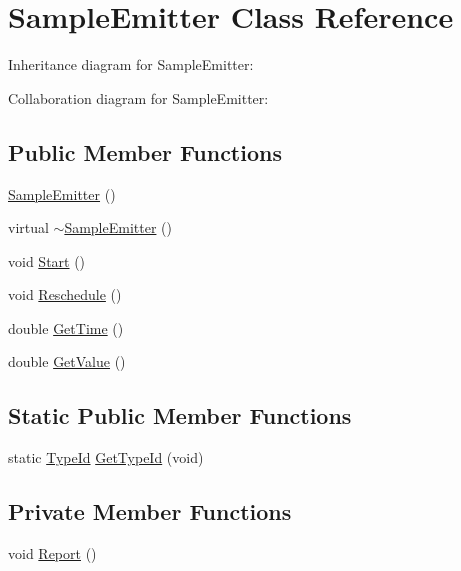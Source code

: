 \hypertarget{classSampleEmitter}{}\section{Sample\+Emitter Class Reference}
\label{classSampleEmitter}


Inheritance diagram for Sample\+Emitter\+:


Collaboration diagram for Sample\+Emitter\+:
\subsection*{Public Member Functions}
\begin{DoxyCompactItemize}
\item 
\hyperlink{classSampleEmitter_a2726579e79413e0033d42770daa9c98a}{Sample\+Emitter} ()
\item 
virtual \hyperlink{classSampleEmitter_a939065d4d678dad2ed37d0f2287e1292}{$\sim$\+Sample\+Emitter} ()
\item 
void \hyperlink{classSampleEmitter_a9de49e02a2e53b76beae11bc2f9f029b}{Start} ()
\item 
void \hyperlink{classSampleEmitter_a805c4a586df173b817701286fa9f44e3}{Reschedule} ()
\item 
double \hyperlink{classSampleEmitter_a4df5d9876d0945a88be9ecd0abc22eaa}{Get\+Time} ()
\item 
double \hyperlink{classSampleEmitter_acfe8e5fe0c3d69294169dfcbdea1feae}{Get\+Value} ()
\end{DoxyCompactItemize}
\subsection*{Static Public Member Functions}
\begin{DoxyCompactItemize}
\item 
static \hyperlink{classns3_1_1TypeId}{Type\+Id} \hyperlink{classSampleEmitter_a87b76cbb1be577cfcd9304be56a5abf7}{Get\+Type\+Id} (void)
\end{DoxyCompactItemize}
\subsection*{Private Member Functions}
\begin{DoxyCompactItemize}
\item 
void \hyperlink{classSampleEmitter_a92ac899da8c761457239ddf886f7091a}{Report} ()
\end{DoxyCompactItemize}

